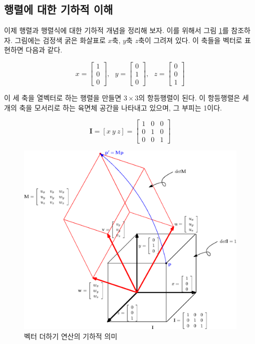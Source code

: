 \subsection{행렬에 대한 기하적 이해}

이제 행렬과 행렬식에 대한 기하적 개념을 정리해 보자. 이를 위해서 그림 \ref{fig:matrix:matrixConcept}를 참조하자.
그림에는 검정색 굵은 화살표로 $x$축, $y$축 $z$축이 그려져 있다.
이 축들을 벡터로 표현하면 다음과 같다.

$$
x = \left [ 
\begin{array}{c}
1 \\
0 \\
0 
\end{array}
\right ], ~~~
y = \left [ 
\begin{array}{c}
0 \\
1 \\
0 
\end{array}
\right ], ~~~
z = \left [ 
\begin{array}{c}
0 \\
0 \\
1 
\end{array}
\right ]
$$


이 세 축을 열벡터로 하는 행렬을 만들면 $3 \times 3$의 항등행렬이 된다.
이 항등행렬은 세 개의 축을 모서리로 하는 육면체 공간을 나타내고 있으며, 그 부피는 1이다.

$$\mathbf I = \left [ x~ y~ z \right ] =
\left [
\begin{array}{ccc}
1 & 0 & 0 \\
0 & 1 & 0 \\
0 & 0 & 1
\end{array}
\right ]
$$

\begin{figure}[h!]
  \centering
    \includegraphics[width=14cm]{Math_matrix/matrixConcept.eps}
    \caption{벡터 더하기 연산의 기하적 의미}
    \label{fig:matrix:matrixConcept}
\end{figure}

